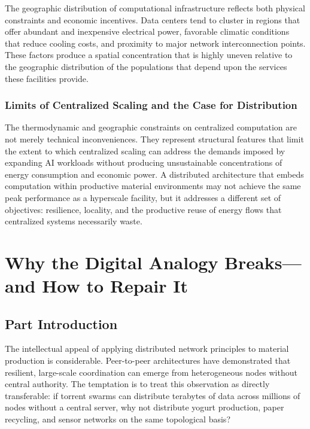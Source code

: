 \documentclass[12pt]{book}
\theoremstyle{definition}
\theoremstyle{remark}
\begin{document}
The geographic distribution of computational infrastructure reflects
both physical constraints and economic incentives. Data centers tend
to cluster in regions that offer abundant and inexpensive electrical
power, favorable climatic conditions that reduce cooling costs, and
proximity to major network interconnection points. These factors
produce a spatial concentration that is highly uneven relative to the
geographic distribution of the populations that depend upon the
services these facilities provide.

\section{Limits of Centralized Scaling and the Case for Distribution}

The thermodynamic and geographic constraints on centralized
computation are not merely technical inconveniences. They represent
structural features that limit the extent to which centralized
scaling can address the demands imposed by expanding AI workloads
without producing unsustainable concentrations of energy consumption
and economic power. A distributed architecture that embeds
computation within productive material environments may not achieve
the same peak performance as a hyperscale facility, but it addresses
a different set of objectives: resilience, locality, and the
productive reuse of energy flows that centralized systems necessarily
waste.

\part{Why the Digital Analogy Breaks---and How to Repair It}

\chapter*{Part Introduction}

The intellectual appeal of applying distributed network principles to
material production is considerable. Peer-to-peer architectures have
demonstrated that resilient, large-scale coordination can emerge from
heterogeneous nodes without central authority. The temptation is to
treat this observation as directly transferable: if torrent swarms can
distribute terabytes of data across millions of nodes without a
central server, why not distribute yogurt production, paper recycling,
and sensor networks on the same topological basis?
\end{document}
